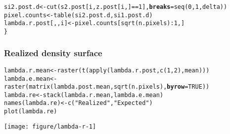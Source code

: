 \documentclass[color=usenames,dvipsnames]{beamer}\usepackage[]{graphicx}\usepackage[]{color}
\makeatletter
\def\maxwidth{ %
  \ifdim\Gin@nat@width>\linewidth
    \linewidth
  \else
    \Gin@nat@width
  \fi
}
\newcommand{\hlnum}[1]{\textcolor[rgb]{0.69,0.494,0}{#1}}%
\newcommand{\hlstr}[1]{\textcolor[rgb]{0.749,0.012,0.012}{#1}}%
\newcommand{\hlopt}[1]{\textcolor[rgb]{0,0,0}{#1}}%
\newcommand{\hlstd}[1]{\textcolor[rgb]{0,0,0}{#1}}%
\newcommand{\hlkwb}[1]{\textcolor[rgb]{0,0.341,0.682}{#1}}%
\newcommand{\hlkwc}[1]{\textcolor[rgb]{0,0,0}{\textbf{#1}}}%
\newcommand{\hlkwd}[1]{\textcolor[rgb]{0.004,0.004,0.506}{#1}}%
\newenvironment{kframe}{%
 \def\at@end@of@kframe{}%
 \ifinner\ifhmode%
  \def\at@end@of@kframe{\end{minipage}}%
  \begin{minipage}{\columnwidth}%
 \fi\fi%
 \def\FrameCommand##1{\hskip\@totalleftmargin \hskip-\fboxsep
 \colorbox{shadecolor}{##1}\hskip-\fboxsep
     \hskip-\linewidth \hskip-\@totalleftmargin \hskip\columnwidth}%
 \MakeFramed {\advance\hsize-\width
   \@totalleftmargin\z@ \linewidth\hsize
   \@setminipage}}%
 {\par\unskip\endMakeFramed%
 \at@end@of@kframe}
\newenvironment{knitrout}{}{} %
\makeatother
\begin{document}
\begin{frame}[fragile]
\begin{knitrout}
\begin{kframe}
\begin{alltt}
    \hlstd{si2.post.d} \hlkwb{<-} \hlkwd{cut}\hlstd{(s2.post[i,z.post[i,]}\hlopt{==}\hlnum{1}\hlstd{],} \hlkwc{breaks}\hlstd{=}\hlkwd{seq}\hlstd{(}\hlnum{0}\hlstd{,} \hlnum{1}\hlstd{, delta))}
    \hlstd{pixel.counts} \hlkwb{<-} \hlkwd{table}\hlstd{(si2.post.d, si1.post.d)}
    \hlstd{lambda.r.post[,,i]} \hlkwb{<-} \hlstd{pixel.counts[}\hlkwd{sqrt}\hlstd{(n.pixels)}\hlopt{:}\hlnum{1}\hlstd{,]}
\hlstd{\}}
\end{alltt}
\end{kframe}
\end{knitrout}
\end{frame}



\begin{frame}[fragile]
  \frametitle{Realized density surface}
\begin{knitrout}\scriptsize
{}\color{fgcolor}\begin{kframe}
\begin{alltt}
\hlstd{lambda.r.mean} \hlkwb{<-} \hlkwd{raster}\hlstd{(}\hlkwd{t}\hlstd{(}\hlkwd{apply}\hlstd{(lambda.r.post,} \hlkwd{c}\hlstd{(}\hlnum{1}\hlstd{,}\hlnum{2}\hlstd{), mean)))}
\hlstd{lambda.e.mean} \hlkwb{<-} \hlkwd{raster}\hlstd{(}\hlkwd{matrix}\hlstd{(lambda.post.mean,} \hlkwd{sqrt}\hlstd{(n.pixels),} \hlkwc{byrow}\hlstd{=}\hlnum{TRUE}\hlstd{))}
\hlstd{lambda.re} \hlkwb{<-} \hlkwd{stack}\hlstd{(lambda.r.mean, lambda.e.mean)}
\hlkwd{names}\hlstd{(lambda.re)} \hlkwb{<-} \hlkwd{c}\hlstd{(}\hlstr{"Realized"}\hlstd{,} \hlstr{"Expected"}\hlstd{)}
\hlkwd{plot}\hlstd{(lambda.re)}
\end{alltt}
\end{kframe}
\texttt{[image: figure/lambda-r-1]} 

\end{knitrout}
\end{frame}
\end{document}
